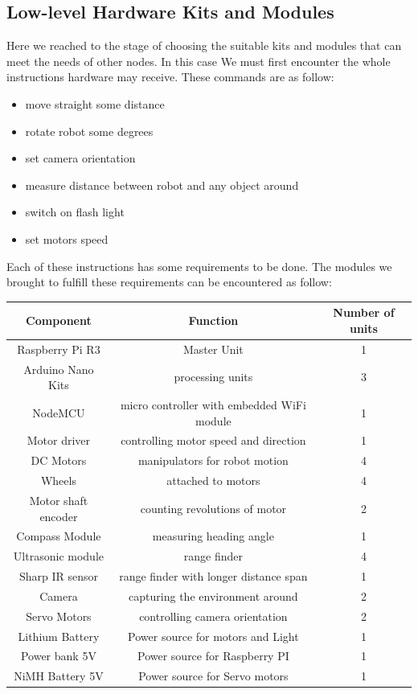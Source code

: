 \documentclass[12pt]{article}
\begin{document}
\newpage

\subsection{Low-level Hardware Kits and Modules}
Here we reached to the stage of choosing the suitable kits and modules that can meet the needs of other nodes. In this case We must first encounter the whole instructions hardware may receive. These commands are as follow:
\begin{itemize}
	\item move straight some distance
	\item rotate robot some degrees
	\item set camera orientation
	\item measure distance between robot and any object around
	\item switch on flash light
	\item set motors speed
\end{itemize}
Each of these instructions has some requirements to be done. The modules we brought to fulfill these requirements can be encountered as follow:
\begin{center}
	\begin{tabular}{| c | c | c|}
		\hline
		Component & Function & Number of units \\
		\hline
		\hline
		Raspberry Pi R3 & Master Unit & 1\\
		\hline
		Arduino Nano Kits & processing units & 3\\
		\hline
		NodeMCU & micro controller with embedded WiFi module & 1\\
		\hline
		Motor driver & controlling motor speed and direction & 1\\
		\hline
		DC Motors & manipulators for robot motion & 4\\
		\hline
		Wheels & attached to motors & 4\\
		\hline
		Motor shaft encoder & counting revolutions of motor & 2\\
		\hline
		Compass Module & measuring heading angle & 1\\
		\hline
		Ultrasonic module & range finder & 4\\
		\hline
		Sharp IR sensor & range finder with longer distance span & 1\\
		\hline
		Camera & capturing the environment around & 2\\
		\hline
		Servo Motors & controlling camera orientation & 2\\
		\hline
		Lithium Battery & Power source for motors and Light & 1\\
		\hline
		Power bank 5V & Power source for Raspberry PI & 1\\
		\hline
		NiMH Battery 5V & Power source for Servo motors & 1\\
		\hline
	\end{tabular}
\end{center}
\end{document}
